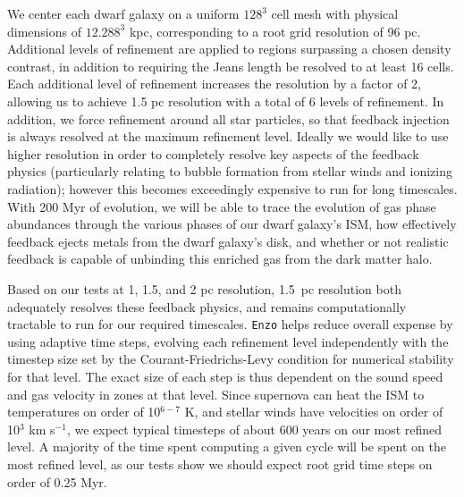 \documentclass[11pt]{article}
\begin{document}
We center each dwarf galaxy on a uniform $128^3$ cell mesh with physical dimensions of $12.288^3$ kpc, corresponding to a root grid resolution of 96 pc. Additional levels of refinement are applied to regions surpassing a chosen density contrast, in addition to requiring the Jeans length be resolved to at least 16 cells. Each additional level of refinement increases the resolution by a factor of 2, allowing us to achieve 1.5 pc resolution with a total of 6 levels of refinement. In addition, we force refinement around all star particles, so that feedback injection is always resolved at the maximum refinement level. Ideally we would like to use higher resolution in order to completely resolve key aspects of the feedback physics (particularly relating to bubble formation from stellar winds and ionizing radiation); however this becomes exceedingly expensive to run for long timescales. With 200 Myr of evolution, we will be able to trace the evolution of gas phase abundances through the various phases of our dwarf galaxy's ISM, how effectively feedback ejects metals from the dwarf galaxy's disk, and whether or not realistic feedback is capable of unbinding this enriched gas from the dark matter halo.


Based on our tests at 1, 1.5, and 2 pc resolution, 1.5~pc resolution both adequately resolves these feedback physics, and remains computationally tractable to run for our required timescales. \texttt{Enzo} helps reduce overall expense by using adaptive time steps, evolving each refinement level independently with the timestep size set by the Courant-Friedrichs-Levy condition for numerical stability for that level. The exact size of each step is thus dependent on the sound speed and gas velocity in zones at that level. Since supernova can heat the ISM to temperatures on order of 10$^{6-7}$ K, and stellar winds have velocities on order of 10$^{3}$ km s$^{-1}$, we expect typical timesteps of about 600 years on our most refined level. A majority of the time spent computing a given cycle will be spent on the most refined level, as our tests show we should expect root grid time steps on order of 0.25 Myr.
\end{document}
